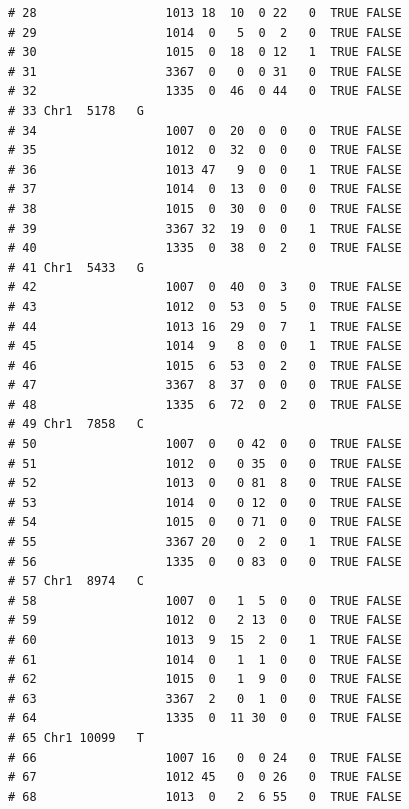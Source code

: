 \documentclass{article}\usepackage[]{graphicx}\usepackage[]{color}
\makeatletter
\newenvironment{kframe}{%
 \def\at@end@of@kframe{}%
 \ifinner\ifhmode%
  \def\at@end@of@kframe{\end{minipage}}%
  \begin{minipage}{\columnwidth}%
 \fi\fi%
 \def\FrameCommand##1{\hskip\@totalleftmargin \hskip-\fboxsep
 \colorbox{shadecolor}{##1}\hskip-\fboxsep
     \hskip-\linewidth \hskip-\@totalleftmargin \hskip\columnwidth}%
 \MakeFramed {\advance\hsize-\width
   \@totalleftmargin\z@ \linewidth\hsize
   \@setminipage}}%
 {\par\unskip\endMakeFramed%
 \at@end@of@kframe}
\newenvironment{knitrout}{}{} %
\makeatother
\begin{document}
\begin{knitrout}
\begin{kframe}
\begin{verbatim}
# 28                  1013 18  10  0 22   0  TRUE FALSE        
# 29                  1014  0   5  0  2   0  TRUE FALSE        
# 30                  1015  0  18  0 12   1  TRUE FALSE        
# 31                  3367  0   0  0 31   0  TRUE FALSE        
# 32                  1335  0  46  0 44   0  TRUE FALSE        
# 33 Chr1  5178   G                                            
# 34                  1007  0  20  0  0   0  TRUE FALSE        
# 35                  1012  0  32  0  0   0  TRUE FALSE        
# 36                  1013 47   9  0  0   1  TRUE FALSE        
# 37                  1014  0  13  0  0   0  TRUE FALSE        
# 38                  1015  0  30  0  0   0  TRUE FALSE        
# 39                  3367 32  19  0  0   1  TRUE FALSE        
# 40                  1335  0  38  0  2   0  TRUE FALSE        
# 41 Chr1  5433   G                                            
# 42                  1007  0  40  0  3   0  TRUE FALSE        
# 43                  1012  0  53  0  5   0  TRUE FALSE        
# 44                  1013 16  29  0  7   1  TRUE FALSE        
# 45                  1014  9   8  0  0   1  TRUE FALSE        
# 46                  1015  6  53  0  2   0  TRUE FALSE        
# 47                  3367  8  37  0  0   0  TRUE FALSE        
# 48                  1335  6  72  0  2   0  TRUE FALSE        
# 49 Chr1  7858   C                                            
# 50                  1007  0   0 42  0   0  TRUE FALSE        
# 51                  1012  0   0 35  0   0  TRUE FALSE        
# 52                  1013  0   0 81  8   0  TRUE FALSE        
# 53                  1014  0   0 12  0   0  TRUE FALSE        
# 54                  1015  0   0 71  0   0  TRUE FALSE        
# 55                  3367 20   0  2  0   1  TRUE FALSE        
# 56                  1335  0   0 83  0   0  TRUE FALSE        
# 57 Chr1  8974   C                                            
# 58                  1007  0   1  5  0   0  TRUE FALSE        
# 59                  1012  0   2 13  0   0  TRUE FALSE        
# 60                  1013  9  15  2  0   1  TRUE FALSE        
# 61                  1014  0   1  1  0   0  TRUE FALSE        
# 62                  1015  0   1  9  0   0  TRUE FALSE        
# 63                  3367  2   0  1  0   0  TRUE FALSE        
# 64                  1335  0  11 30  0   0  TRUE FALSE        
# 65 Chr1 10099   T                                            
# 66                  1007 16   0  0 24   0  TRUE FALSE        
# 67                  1012 45   0  0 26   0  TRUE FALSE        
# 68                  1013  0   2  6 55   0  TRUE FALSE        

\end{verbatim}
\end{kframe}
\end{knitrout}
\end{document}

